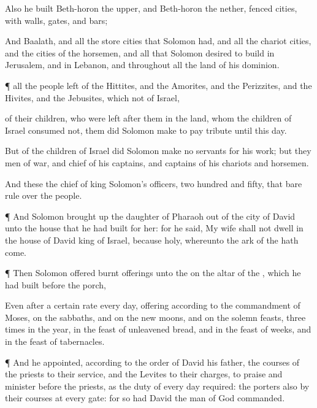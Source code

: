 {Also he
built
Beth-horon the
upper, and
Beth-horon the
nether,
fenced
cities, with
walls,
gates, and
bars;

And
Baalath, and all the
store
cities that
Solomon had, and all the
chariot
cities, and the
cities of the
horsemen, and all that
Solomon
desired to
build in
Jerusalem, and in
Lebanon, and throughout all the
land of his
dominion.


\par }{\PP {}¶
{} all the
people
{}
left of the
Hittites, and the
Amorites, and the
Perizzites, and the
Hivites, and the
Jebusites, which
{} not of
Israel,

 of their
children, who were
left
after them in the
land, whom the
children of
Israel
consumed not, them did
Solomon make to
pay
tribute until this
day.

But of the
children of
Israel did
Solomon
make no
servants for his
work; but they
{}
men of
war, and
chief of his
captains, and
captains of his
chariots and
horsemen.

And these
{} the
chief of
king
Solomon’s
officers,
{} two
hundred and
fifty, that bare
rule over the
people.


\par }{\PP {}¶ And
Solomon brought
up the
daughter of
Pharaoh out of the
city of
David unto the
house that he had
built for her: for he
said, My
wife shall not
dwell in the
house of
David
king of
Israel, because
{}
holy, whereunto the
ark of the
{} hath
come.


\par }{\PP {}¶ Then
Solomon
offered burnt
offerings unto the
{} on the
altar of the
{}, which he had
built
before the
porch,

Even after a certain
rate every
day,
offering according to the
commandment of
Moses, on the
sabbaths, and on the new
moons, and on the solemn
feasts,
three
times in the
year,
{} in the
feast of unleavened
bread, and in the
feast of
weeks, and in the
feast of
tabernacles.


\par }{\PP {}¶ And he
appointed, according to the
order of
David his
father, the
courses of the
priests to their
service, and the
Levites to their
charges, to
praise and
minister before the
priests, as the
duty of every
day
required: the
porters also by their
courses at every
gate: for so had
David the
man of
God
commanded.

}
